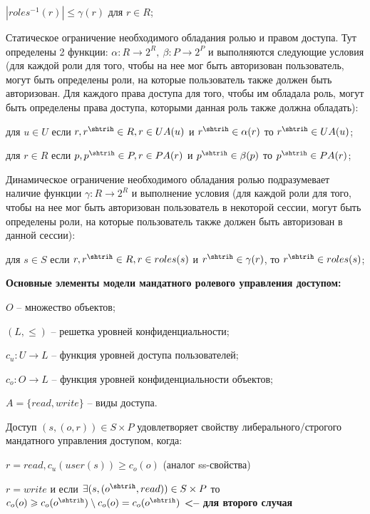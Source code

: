 \begin{enumerate*}
\begin{itemize*}
			\item $|roles^{-1}(r)| \leqslant \gamma(r)$ для $r \in R$;
		\end{itemize*}
	\item Статическое ограничение необходимого обладания ролью и правом доступа. Тут определены 2 функции: $\alpha: R \to 2^R, \ \beta:P \to 2^P$ и выполняются следующие условия (для каждой роли для того, чтобы на нее мог
	быть авторизован пользователь, могут быть определены роли, на которые пользователь также должен быть авторизован. Для каждого права доступа для того, чтобы им обладала роль, могут быть определены права доступа,
	которыми данная роль также должна обладать):
		\begin{itemize*}
			\item для $u \in U$ если $r, r^{\shtrih} \in R, r \in UA(u)$ и $r^{\shtrih} \in \alpha(r)$ то $r^{\shtrih} \in UA(u)$;
			\item для $r \in R$ если $p, p^{\shtrih} \in P, r \in PA(r)$ и $p^{\shtrih} \in \beta(p)$ то $p^{\shtrih} \in PA(r)$;
		\end{itemize*}
	\item Динамическое ограничение необходимого обладания ролью подразумевает наличие функции $\gamma:R \to 2^R$ и выполнение условия (для каждой роли для того, чтобы на нее мог быть авторизован пользователь
	в некоторой сессии, могут быть определены роли, на которые пользователь также должен быть авторизован в данной сессии):
		\begin{itemize*}
			\item для $s \in S$ если $r, r^{\shtrih} \in R, r \in roles(s)$ и $r^{\shtrih} \in \gamma(r)$, то $r^{\shtrih} \in roles(s)$;
		\end{itemize*}
\end{enumerate*}

\textbf{Основные элементы модели мандатного ролевого управления доступом:}
\begin{enumerate*}
	\item $O$ -- множество объектов;
	\item $(L, \leqslant)$ -- решетка уровней конфиденциальности;
	\item $c_u: U \to L$ -- функция уровней доступа пользователей;
	\item $c_o: O \to L$ -- функция уровней конфиденциальности объектов;
	\item $A = \{read, write\}$ -- виды доступа.
\end{enumerate*}

\begin{defs}
	Доступ $(s, (o,r)) \in S \times P$ удовлетворяет свойству либерального/строгого мандатного управления доступом, когда:
		\begin{itemize*}
			\item $r = read, c_u(user(s)) \geqslant c_o(o)$ (аналог ss-свойства)
			\item $r = write$ и если $\exists (s, (o^{\shtrih}, read)) \in S \times P$ то $c_o(o) \geqslant c_o(o^{\shtrih})  \setminus c_o(o) = c_o(o^{\shtrih})$ \textbf{<-- для второго случая}
		\end{itemize*}
\end{defs}

